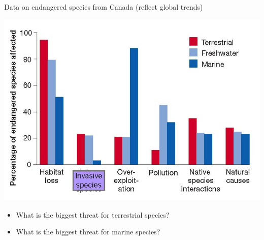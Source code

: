 \begin{frame}[t]
    \begin{adjustwidth}{-2em}{-1.5em}
        \vspace{-3mm}
        Data on endangered species from Canada (reflect global trends)

        \vspace{-1mm}
        \begin{center}
            \includegraphics[width=0.7\linewidth]{endangered-threats.png}
        \end{center}

        \vspace{-4mm}
        \begin{itemize}

            \item What is the biggest threat for terrestrial species?


            \item What is the biggest threat for marine species?

        \end{itemize}
    \end{adjustwidth}
\end{frame}

